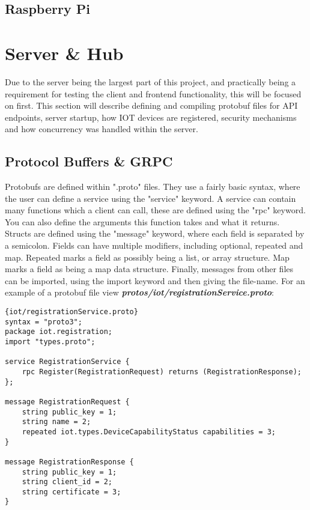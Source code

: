 \subsection{Raspberry Pi} \label{sec:chap3:technology:raspi}

\section{Server \& Hub} \label{sec:chap3:server}
Due to the server being the largest part of this project, and practically being a requirement for testing the client and frontend functionality, this will be focused on first. This section will describe defining and compiling protobuf files for API endpoints, server startup, how IOT devices are registered, security mechanisms and how concurrency was handled within the server. 

\subsection{Protocol Buffers \& GRPC} \label{sec:chap3:server:protoBufs}
Protobufs are defined within ".proto" files. They use a fairly basic syntax, where the user can define a service using the "service" keyword. A service can contain many functions which a client can call, these are defined using the "rpc" keyword. You can also define the arguments this function takes and what it returns. Structs are defined using the "message" keyword, where each field is separated by a semicolon. Fields can have multiple modifiers, including optional, repeated and map. Repeated marks a field as possibly being a list, or array structure. Map marks a field as being a map data structure. Finally, messages from other files can be imported, using the import keyword and then giving the file-name. \cite{protobufDocs} For an example of a protobuf file view \textbf{\textit{protos/iot/registrationService.proto}}:

\begin{lstlisting}[language=protobuf3, style=boxed]{iot/registrationService.proto}
syntax = "proto3";
package iot.registration;
import "types.proto";

service RegistrationService {
    rpc Register(RegistrationRequest) returns (RegistrationResponse);
};

message RegistrationRequest {
    string public_key = 1;
    string name = 2;
    repeated iot.types.DeviceCapabilityStatus capabilities = 3;
}

message RegistrationResponse {
    string public_key = 1;
    string client_id = 2;
    string certificate = 3;
}
\end{lstlisting}

